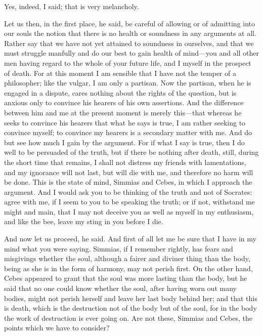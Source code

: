 \documentclass[11pt,letter]{article}
\begin{document}
\par  Yes, indeed, I said; that is very melancholy.

\par  Let us then, in the first place, he said, be careful of allowing or of admitting into our souls the notion that there is no health or soundness in any arguments at all. Rather say that we have not yet attained to soundness in ourselves, and that we must struggle manfully and do our best to gain health of mind—you and all other men having regard to the whole of your future life, and I myself in the prospect of death. For at this moment I am sensible that I have not the temper of a philosopher; like the vulgar, I am only a partisan. Now the partisan, when he is engaged in a dispute, cares nothing about the rights of the question, but is anxious only to convince his hearers of his own assertions. And the difference between him and me at the present moment is merely this—that whereas he seeks to convince his hearers that what he says is true, I am rather seeking to convince myself; to convince my hearers is a secondary matter with me. And do but see how much I gain by the argument. For if what I say is true, then I do well to be persuaded of the truth, but if there be nothing after death, still, during the short time that remains, I shall not distress my friends with lamentations, and my ignorance will not last, but will die with me, and therefore no harm will be done. This is the state of mind, Simmias and Cebes, in which I approach the argument. And I would ask you to be thinking of the truth and not of Socrates: agree with me, if I seem to you to be speaking the truth; or if not, withstand me might and main, that I may not deceive you as well as myself in my enthusiasm, and like the bee, leave my sting in you before I die.

\par  And now let us proceed, he said. And first of all let me be sure that I have in my mind what you were saying. Simmias, if I remember rightly, has fears and misgivings whether the soul, although a fairer and diviner thing than the body, being as she is in the form of harmony, may not perish first. On the other hand, Cebes appeared to grant that the soul was more lasting than the body, but he said that no one could know whether the soul, after having worn out many bodies, might not perish herself and leave her last body behind her; and that this is death, which is the destruction not of the body but of the soul, for in the body the work of destruction is ever going on. Are not these, Simmias and Cebes, the points which we have to consider?
\end{document}
